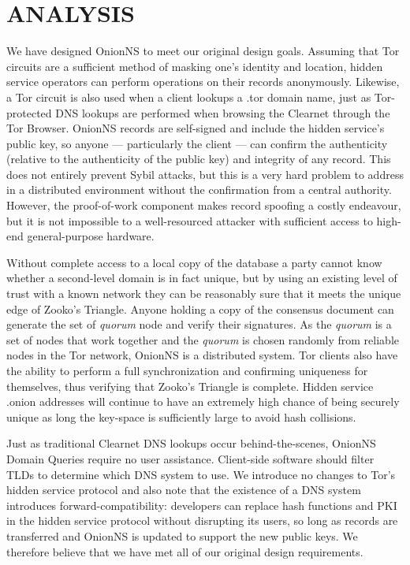 
\chapter{ANALYSIS}


We have designed OnionNS to meet our original design goals. Assuming that Tor circuits are a sufficient method of masking one's identity and location, hidden service operators can perform operations on their records anonymously. Likewise, a Tor circuit is also used when a client lookups a .tor domain name, just as Tor-protected DNS lookups are performed when browsing the Clearnet through the Tor Browser. OnionNS records are self-signed and include the hidden service's public key, so anyone --- particularly the client --- can confirm the authenticity (relative to the authenticity of the public key) and integrity of any record. This does not entirely prevent Sybil attacks, but this is a very hard problem to address in a distributed environment without the confirmation from a central authority. However, the proof-of-work component makes record spoofing a costly endeavour, but it is not impossible to a well-resourced attacker with sufficient access to high-end general-purpose hardware.

Without complete access to a local copy of the database a party cannot know whether a second-level domain is in fact unique, but by using an existing level of trust with a known network they can be reasonably sure that it meets the unique edge of Zooko's Triangle. Anyone holding a copy of the consensus document can generate the set of \emph{quorum} node and verify their signatures. As the \emph{quorum} is a set of nodes that work together and the \emph{quorum} is chosen randomly from reliable nodes in the Tor network, OnionNS is a distributed system. Tor clients also have the ability to perform a full synchronization and confirming uniqueness for themselves, thus verifying that Zooko's Triangle is complete. Hidden service .onion addresses will continue to have an extremely high chance of being securely unique as long the key-space is sufficiently large to avoid hash collisions.

Just as traditional Clearnet DNS lookups occur behind-the-scenes, OnionNS Domain Queries require no user assistance. Client-side software should filter TLDs to determine which DNS system to use. We introduce no changes to Tor's hidden service protocol and also note that the existence of a DNS system introduces forward-compatibility: developers can replace hash functions and PKI in the hidden service protocol without disrupting its users, so long as records are transferred and OnionNS is updated to support the new public keys. We therefore believe that we have met all of our original design requirements.

